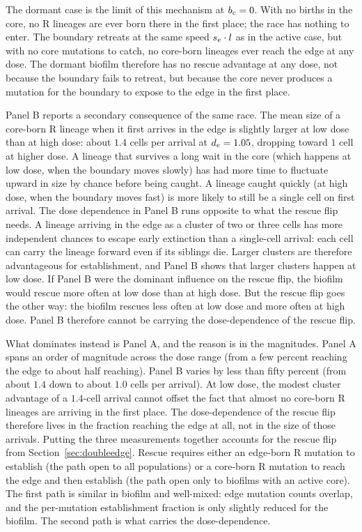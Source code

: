 The dormant case is the limit of this mechanism at $b_c = 0$. With no births in the core, no R lineages are ever born there in the first place; the race has nothing to enter. The boundary retreats at the same speed $s_e \cdot l$ as in the active case, but with no core mutations to catch, no core-born lineages ever reach the edge at any dose. The dormant biofilm therefore has no rescue advantage at any dose, not because the boundary fails to retreat, but because the core never produces a mutation for the boundary to expose to the edge in the first place.

Panel B reports a secondary consequence of the same race. The mean size of a core-born R lineage when it first arrives in the edge is slightly larger at low dose than at high dose: about $1.4$ cells per arrival at $d_e = 1.05$, dropping toward $1$ cell at higher dose. A lineage that survives a long wait in the core (which happens at low dose, when the boundary moves slowly) has had more time to fluctuate upward in size by chance before being caught. A lineage caught quickly (at high dose, when the boundary moves fast) is more likely to still be a single cell on first arrival. The dose dependence in Panel B runs opposite to what the rescue flip needs. A lineage arriving in the edge as a cluster of two or three cells has more independent chances to escape early extinction than a single-cell arrival: each cell can carry the lineage forward even if its siblings die. Larger clusters are therefore advantageous for establishment, and Panel B shows that larger clusters happen at low dose. If Panel B were the dominant influence on the rescue flip, the biofilm would rescue more often at low dose than at high dose. But the rescue flip goes the other way: the biofilm rescues less often at low dose and more often at high dose. Panel B therefore cannot be carrying the dose-dependence of the rescue flip.

What dominates instead is Panel A, and the reason is in the magnitudes. Panel A spans an order of magnitude across the dose range (from a few percent reaching the edge to about half reaching). Panel B varies by less than fifty percent (from about $1.4$ down to about $1.0$ cells per arrival). At low dose, the modest cluster advantage of a $1.4$-cell arrival cannot offset the fact that almost no core-born R lineages are arriving in the first place. The dose-dependence of the rescue flip therefore lives in the fraction reaching the edge at all, not in the size of those arrivals. Putting the three measurements together accounts for the rescue flip from Section~\ref{sec:doubleedge}. Rescue requires either an edge-born R mutation to establish (the path open to all populations) or a core-born R mutation to reach the edge and then establish (the path open only to biofilms with an active core). The first path is similar in biofilm and well-mixed: edge mutation counts overlap, and the per-mutation establishment fraction is only slightly reduced for the biofilm. The second path is what carries the dose-dependence.

